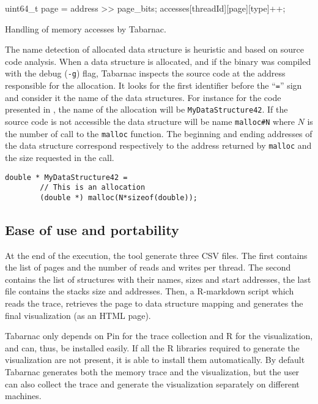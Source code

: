 \begin{algorithm}[htb]
    \begin{algorithmic}
            \State uint64\_t page = address >> page\_bits;
            \State accesses[threadId][page][type]++;
        \EndFunction
    \end{algorithmic}
    \caption{Handling of memory accesses by Tabarnac.}
    \label{alg:Tabarnac}
\end{algorithm}

The name detection of allocated data structure is heuristic and based on source code analysis.
When a data structure is allocated, and if the binary was compiled with the debug (\texttt{-g}) flag, \gls{Tabarnac} inspects the source code at the address responsible for the allocation.
It looks for the first identifier before the ``\texttt{=}'' sign and consider it the name of the data structures.
For instance for the code presented in , the name of the allocation will be \texttt{MyDataStructure42}.
If the source code is not accessible the data structure will be name \texttt{malloc\#N} where $N$ is the number of call to the \texttt{malloc} function.
The beginning and ending addresses of the data structure correspond respectively to the address returned by \texttt{malloc} and the size requested in the call.

\begin{lstlisting}[caption={A simple allocation.}, label=lst:alloc,float=htb]
    double * MyDataStructure42 =
        // This is an allocation
        (double *) malloc(N*sizeof(double));
\end{lstlisting}

\subsection{Ease of use and portability}

At the end of the execution, the tool generate three \gls{CSV} files.
The first contains the list of pages and the number of reads and writes per thread.
The second contains the list of structures with their names, sizes and start addresses, the last file contains the stacks size and addresses.
Then, a \gls{R-markdown} script which reads the trace, retrieves the page to data structure mapping and generates the final visualization (as an HTML page).

\gls{Tabarnac} only depends on \gls{Pin} for the trace collection and \gls{R} for the visualization, and can, thus, be installed easily.
If all the R libraries required to generate the visualization are not present, it is able to install them automatically.
By default \gls{Tabarnac} generates both the memory trace and the visualization, but the user can also collect the trace and generate the visualization separately on different machines.

